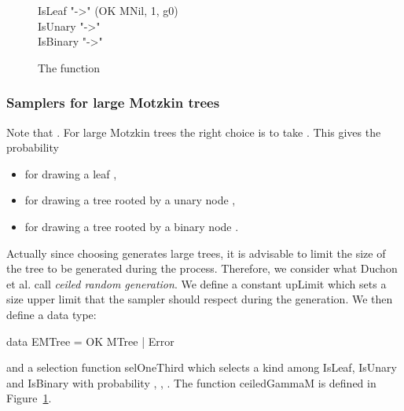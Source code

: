 \documentclass{sig-alternate}
\begin{document}
\begin{figure*}[!t]
\begin{figure}[!t]
\begin{haskell}
{      IsLeaf "->" (OK MNil, 1, g0)\\
      IsUnary "->" \\
      IsBinary "->" }
  \end{haskell}
  \caption{The function }
  \label{fig:ceiledMotkin}
\end{figure}
\fi
\subsubsection*{Samplers for large Motzkin trees}
Note that . For large Motzkin trees the right choice is to take . This gives the probability
\begin{itemize}
\item for drawing a leaf ,
\item for drawing a tree rooted by a unary node ,
\item for drawing a tree rooted by a binary node .
\end{itemize}
Actually since choosing  generates large trees,  it is advisable to
limit the size of the tree to be generated during the process.  Therefore, we
consider what Duchon et al. call \emph{ceiled random generation}.  We define a
constant \<upLimit\> which sets a size upper limit that the sampler should respect
during the generation.  We then define a data type:
\begin{haskell}
  data EMTree = OK MTree | Error
\end{haskell}
and a selection function \<selOneThird\> which selects a kind among \<IsLeaf\>,
\<IsUnary\> and \<IsBinary\> with probability , , .  The function
\<ceiledGammaM\> is defined in Figure~\ref{fig:ceiledMotkin}.


\end{figure*}
\end{document}
